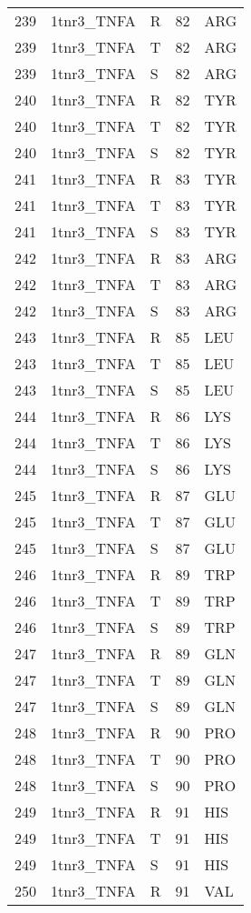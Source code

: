 \begin{tiny}
\begin{longtable}[l]{l|l|l|l|l}
	239 & 1tnr3\_TNFA & R & 82 & ARG \\
	239 & 1tnr3\_TNFA & T & 82 & ARG \\
	239 & 1tnr3\_TNFA & S & 82 & ARG \\
	240 & 1tnr3\_TNFA & R & 82 & TYR \\
	240 & 1tnr3\_TNFA & T & 82 & TYR \\
	240 & 1tnr3\_TNFA & S & 82 & TYR \\
	241 & 1tnr3\_TNFA & R & 83 & TYR \\
	241 & 1tnr3\_TNFA & T & 83 & TYR \\
	241 & 1tnr3\_TNFA & S & 83 & TYR \\
	242 & 1tnr3\_TNFA & R & 83 & ARG \\
	242 & 1tnr3\_TNFA & T & 83 & ARG \\
	242 & 1tnr3\_TNFA & S & 83 & ARG \\
	243 & 1tnr3\_TNFA & R & 85 & LEU \\
	243 & 1tnr3\_TNFA & T & 85 & LEU \\
	243 & 1tnr3\_TNFA & S & 85 & LEU \\
	244 & 1tnr3\_TNFA & R & 86 & LYS \\
	244 & 1tnr3\_TNFA & T & 86 & LYS \\
	244 & 1tnr3\_TNFA & S & 86 & LYS \\
	245 & 1tnr3\_TNFA & R & 87 & GLU \\
	245 & 1tnr3\_TNFA & T & 87 & GLU \\
	245 & 1tnr3\_TNFA & S & 87 & GLU \\
	246 & 1tnr3\_TNFA & R & 89 & TRP \\
	246 & 1tnr3\_TNFA & T & 89 & TRP \\
	246 & 1tnr3\_TNFA & S & 89 & TRP \\
	247 & 1tnr3\_TNFA & R & 89 & GLN \\
	247 & 1tnr3\_TNFA & T & 89 & GLN \\
	247 & 1tnr3\_TNFA & S & 89 & GLN \\
	248 & 1tnr3\_TNFA & R & 90 & PRO \\
	248 & 1tnr3\_TNFA & T & 90 & PRO \\
	248 & 1tnr3\_TNFA & S & 90 & PRO \\
	249 & 1tnr3\_TNFA & R & 91 & HIS \\
	249 & 1tnr3\_TNFA & T & 91 & HIS \\
	249 & 1tnr3\_TNFA & S & 91 & HIS \\
	250 & 1tnr3\_TNFA & R & 91 & VAL \\

\end{longtable}
\end{tiny}
